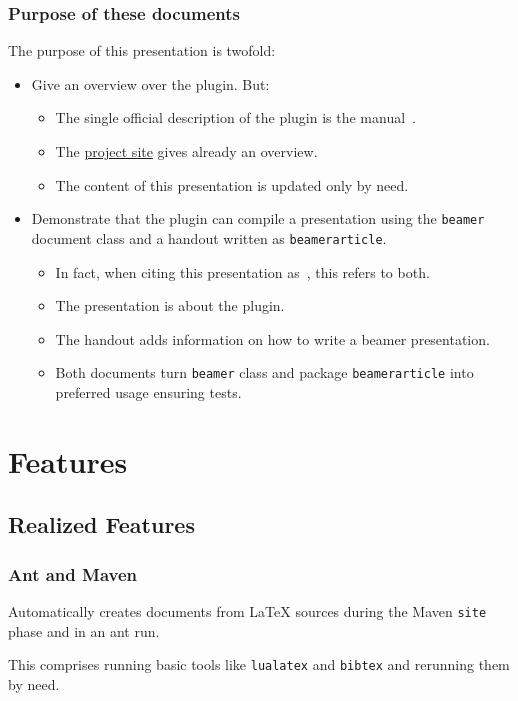 \begin{frame}
  \frametitle{Purpose of these documents }
  The purpose of this presentation is twofold:
  \begin{itemize}
    \item Give an overview over the plugin. 
    \alert{But: }
    \begin{itemize}
      \item The single official description of the plugin is the manual~\cite{LatexPlugin}.
      \item The 
      \href{http://simuline.eu/LatexMavenPlugin/index.html}{project site} 
      gives already an overview. 
      \item 
      The content of this presentation is updated only by need. 
    \end{itemize}
    
    \item Demonstrate that the plugin can compile a presentation using the \texttt{beamer} document class 
    and a handout written as \texttt{beamerarticle}. 

    \begin{itemize}
      \item In fact, when citing this presentation as~\cite{PresBeamer}, 
      this refers to both. 
      \item The presentation is about the plugin. 
      \item The handout adds information on how to write a beamer presentation. 
      \item Both documents turn \texttt{beamer} class and package \texttt{beamerarticle} into preferred usage 
      ensuring tests. 
    \end{itemize}
  \end{itemize}
  
\end{frame}


\section{Features}

\subsection{Realized Features}

\begin{frame}
  \frametitle{Ant and Maven}
  Automatically creates documents from LaTeX sources during the Maven \texttt{site} phase 
  and in an ant run. 

  This comprises running basic tools like \texttt{lualatex} and \texttt{bibtex} 
  and rerunning them by need. 

\end{frame}

